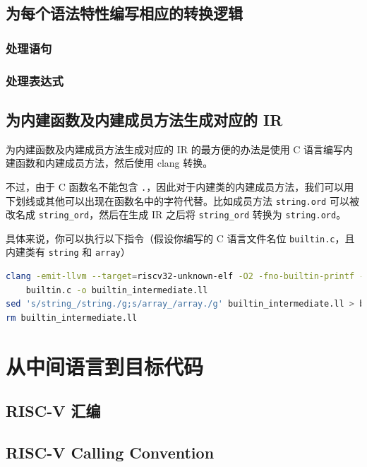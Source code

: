 \subsection{为每个语法特性编写相应的转换逻辑}\label{AST-to-IR-specific-grammar}

\subsubsection{处理语句}\label{AST-to-IR-statements}

\subsubsection{处理表达式}\label{AST-to-IR-expression}

\subsection{为内建函数及内建成员方法生成对应的 IR}\label{AST-to-IR-for-builtin}

为内建函数及内建成员方法生成对应的 IR 的最方便的办法是使用 C
语言编写内建函数和内建成员方法，然后使用 clang 转换。

不过，由于 C 函数名不能包含 \texttt{.}，因此对于内建类的内建成员方法，我们可以用下划线或其他可以出现在函数名中的字符代替。比如成员方法
\texttt{string.ord} 可以被改名成 \texttt{string\_ord}，然后在生成 IR 之后将
\texttt{string\_ord} 转换为 \texttt{string.ord}。

具体来说，你可以执行以下指令（假设你编写的 C 语言文件名位 \texttt{builtin.c}，且内建类有 \texttt{string} 和 \texttt{array}）
\begin{lstlisting}[language=sh]
clang -emit-llvm --target=riscv32-unknown-elf -O2 -fno-builtin-printf -fno-builtin-memcpy \
    builtin.c -o builtin_intermediate.ll
sed 's/string_/string./g;s/array_/array./g' builtin_intermediate.ll > builtin.ll
rm builtin_intermediate.ll
\end{lstlisting}

\section{从中间语言到目标代码}

\subsection{RISC-V 汇编}

\subsection{RISC-V Calling Convention}
